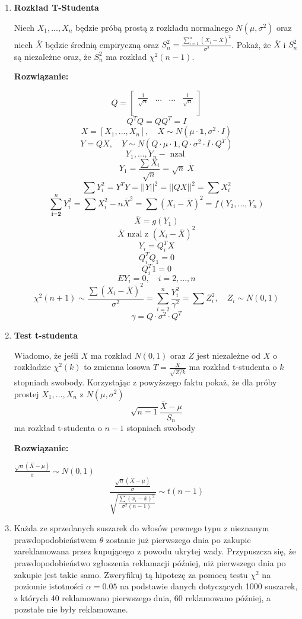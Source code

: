 \documentclass[11pt]{article}
\begin{document}
\begin{enumerate}
    \item \textbf{Rozkład T-Studenta}
    \par 
    Niech \(X_1, ..., X_n\) będzie próbą prostą z rozkładu normalnego \(N(\mu, \sigma^2)\) oraz niech \(\overline{X}\) będzie średnią empiryczną oraz \(S_n^2 = \frac{\sum_{i=1}^{n} (X_i - \overline{X})^2}{\sigma^2}\). Pokaż, że \(\overline{X}\) i \(S_n^2\) są niezależne oraz, że \(S_n^2\) ma rozkład \(\chi^2(n-1)\). 
    \par 
    \textbf{Rozwiązanie: }
    \par
    \[Q = \begin{bmatrix} \frac{1}{\sqrt{n}} & ... & ... & \frac{1}{\sqrt{n}} \\
    \\
    \end{bmatrix}\]
    \[Q^T Q = Q Q^T = I\]
    \[X = [X_1, ..., X_n ], \quad X\sim N(\mu \cdot \textbf{1}, \sigma^2 \cdot I)\]
    \[Y = QX, \quad Y \sim N(Q\cdot \mu\cdot  \textbf{1}, Q \cdot  \sigma^2 \cdot  I \cdot  Q^T)\]
    \[Y_1, ..., Y_n - \text{ nzal }\]
    \[Y_1 = \frac{\sum X_i}{\sqrt{n}} = \sqrt{n} \:  \overline{X}\]
    \[\sum Y_i^2 = Y^T Y = ||Y||^2 = ||QX||^2 = \sum X_i^2\]
    \[\sum_{\textbf{i=2}}^{n} Y_i^2 = \sum X_i^2 - n \overline{X}^2 = \sum (X_i - \overline{X})^2 = f(Y_2, ..., Y_n)\]
    \[\overline{X}= g(Y_1)\]
    \[\overline{X} \text{ nzal z } (X_i - \overline{X})^2\]
    \[Y_i = Q_i^T X\]
    \[Q_i^T Q_1 = 0\]
    \[Q_i^T 1 = 0\]
    \[E Y_i = 0, \quad i = 2,..., n \]
    \[\chi^2(n+1) \sim \frac{\sum(X_i - \overline{X})^2}{\sigma^2} = \sum_{i=2}^n \frac{Y_i^2}{\gamma^2} = \sum Z_i^2, \quad Z_i \sim N(0,1)\]
    \[\gamma = Q \cdot \sigma^2 \cdot Q^T\]
    \item \textbf{Test t-studenta}
    \par 
    Wiadomo, że jeśli \(X\) ma rozkład \(N(0,1)\) oraz \(Z\) jest niezależne od \(X\) o rozkładzie \(\chi^2(k)\) to zmienna losowa \(T = \frac{X}{\sqrt{Z/k}}\) ma rozkład t-studenta o \(k\) stopniach swobody. Korzystając z powyższego faktu pokaż, że dla próby prostej \(X_1, ..., X_n\) z \(N(\mu, \sigma^2)\)
    \[\sqrt{n=1} \frac{\overline{X} - \mu}{S_n}\]
    ma rozkład t-studenta o \(n-1\) stopniach swobody
    \par
    \textbf{Rozwiązanie: }
    \par 
    \(\frac{\sqrt{n}(\overline{X} -\mu)}{\sigma} \sim N(0,1)\)
    \[\frac{\frac{\sqrt{n}(\overline{X} -\mu)}{\sigma}}{\sqrt{\frac{\sum(x_i - \overline{x})^2}{\sigma^2 (n-1)}}} \sim t(n-1)\]
    \item Każda ze sprzedanych suszarek do włosów pewnego typu z nieznanym prawdopodobieństwem \(\theta\) zostanie już pierwszego dnia po zakupie zareklamowana przez kupującego z powodu ukrytej wady. Przypuszcza się, że prawdopodobieństwo zgłoszenia reklamacji później, niż pierwszego dnia po zakupie jest takie samo. Zweryfikuj tą hipotezę za pomocą testu \(\chi^2\) na poziomie istotności \(\alpha = 0.05\) na podstawie danych dotyczących 1000 suszarek, z których 40 reklamowano pierwszego dnia, 60 reklamowano później, a pozstałe nie były reklamowane.

\end{enumerate}
\end{document}
